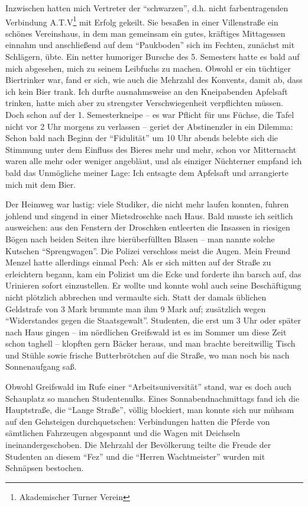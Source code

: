 Inzwischen hatten mich Vertreter der \enquote{schwarzen}, d.h. nicht farbentragenden Verbindung A.T.V\footnote{Akademischer Turner Verein} mit Erfolg gekeilt. Sie besaßen in einer Villenstraße ein schönes Vereinshaus, in dem man gemeinsam ein gutes, kräftiges Mittagessen einnahm und anschließend auf dem \enquote{Paukboden} sich im Fechten, zunächst mit Schlägern, übte. Ein netter humoriger Bursche des 5. Semesters hatte es bald auf mich abgesehen, mich zu seinem Leibfuchs zu machen. Obwohl er ein tüchtiger Biertrinker war, fand er sich, wie auch die Mehrzahl des Konvents, damit ab, dass ich kein Bier trank. Ich durfte ausnahmsweise an den Kneipabenden Apfelsaft trinken, hatte mich aber zu strengster Verschwiegenheit verpflichten müssen. Doch schon auf der 1. Semesterkneipe -- es war Pflicht für uns Füchse, die Tafel nicht vor 2 Uhr morgens zu verlassen -- geriet der Abstinenzler in ein Dilemma: Schon bald nach Beginn der \enquote{Fidulität} um 10 Uhr abends belebte sich die Stimmung unter dem Einfluss des Bieres mehr und mehr, schon vor Mitternacht waren alle mehr oder weniger angebläut, und als einziger Nüchterner empfand ich bald das Unmögliche meiner Lage: Ich entsagte dem Apfelsaft und arrangierte mich mit dem Bier.

Der Heimweg war lustig: viele Studiker, die nicht mehr laufen konnten, fuhren johlend und singend in einer Mietsdroschke nach Haus. Bald musste ich seitlich ausweichen: aus den Fenstern der Droschken entleerten die Insassen in riesigen Bögen nach beiden Seiten ihre bierüberfüllten Blasen -- man nannte solche Kutschen \enquote{Sprengwagen}. Die Polizei verschloss meist die Augen. Mein Freund Menzel hatte allerdings einmal Pech: Als er sich mitten auf der Straße zu erleichtern begann, kam ein Polizist um die Ecke und forderte ihn barsch auf, das Urinieren sofort einzustellen. Er wollte und konnte wohl auch seine Beschäftigung nicht plötzlich abbrechen und vermaulte sich. Statt der damals üblichen Geldstrafe von 3 Mark brummte man ihm 9 Mark auf; zusätzlich wegen \enquote{Widerstandes gegen die Staatsgewalt}. Studenten, die erst um 3 Uhr oder später nach Haus gingen -- im nördlichen Greifswald ist es im Sommer um diese Zeit schon taghell -- klopften gern Bäcker heraus, und man brachte bereitwillig Tisch und Stühle sowie frische Butterbrötchen auf die Straße, wo man noch bis nach Sonnenaufgang saß.

Obwohl Greifswald im Rufe einer \enquote{Arbeitsuniversität} stand, war es doch auch Schauplatz so manchen Studentenulks. Eines Sonnabendnachmittags fand ich die Hauptstraße, die \enquote{Lange Straße}, völlig blockiert, man konnte sich nur mühsam auf den Gehsteigen durchquetschen: Verbindungen hatten die Pferde von sämtlichen Fahrzeugen abgespannt und die Wagen mit Deichseln ineinandergeschoben. Die Mehrzahl der Bevölkerung teilte die Freude der Studenten an diesem \enquote{Fez} und die \enquote{Herren Wachtmeister} wurden mit Schnäpsen bestochen.

